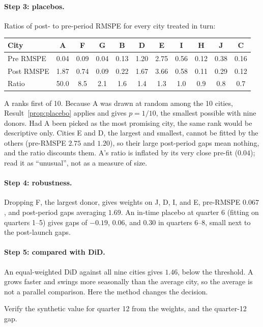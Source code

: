 \documentclass[11pt]{article}
\begin{document}
\paragraph{Step 3: placebos.} Ratios of post- to pre-period RMSPE for every city treated in turn:
\begin{center}
\small
\begin{tabular}{lcccccccccc}
\toprule
City & A & F & G & B & D & E & I & H & J & C \\
\midrule
Pre RMSPE & 0.04 & 0.09 & 0.04 & 0.13 & 1.20 & 2.75 & 0.56 & 0.12 & 0.38 & 0.16 \\
Post RMSPE & 1.87 & 0.74 & 0.09 & 0.22 & 1.67 & 3.66 & 0.58 & 0.11 & 0.29 & 0.12 \\
Ratio & 50.0 & 8.5 & 2.1 & 1.6 & 1.4 & 1.3 & 1.0 & 0.9 & 0.8 & 0.7 \\
\bottomrule
\end{tabular}
\end{center}
A ranks first of 10. Because A was drawn at random among the 10 cities, Result~\ref{prop:placebo} applies and gives $p = 1/10$, the smallest
possible with nine donors.
Had A been picked as the most promising city, the same rank would be descriptive only. Cities E and D, the largest and smallest, cannot be fitted by
the others (pre-RMSPE $2.75$ and $1.20$), so their large post-period gaps mean nothing, and the ratio discounts them. A's ratio is inflated by its very
close pre-fit ($0.04$); read it as ``unusual'', not as a measure of size.

\paragraph{Step 4: robustness.} Dropping F, the largest donor, gives weights on J, D, I, and E, pre-RMSPE $0.067$, and post-period gaps averaging $1.69$.
An in-time placebo at quarter 6 (fitting on quarters 1--5) gives gaps of $-0.19$, $0.06$, and $0.30$ in quarters 6--8, small next to the post-launch gaps.

\paragraph{Step 5: compared with DiD.} An equal-weighted DiD against all nine cities gives $1.46$, below the threshold. A grows faster and swings more
seasonally than the average city, so the average is not a parallel comparison. Here the method changes the decision.

\begin{exercise}[computation]
Verify the synthetic value for quarter 12 from the weights, and the quarter-12 gap.
\end{exercise}
\end{document}
